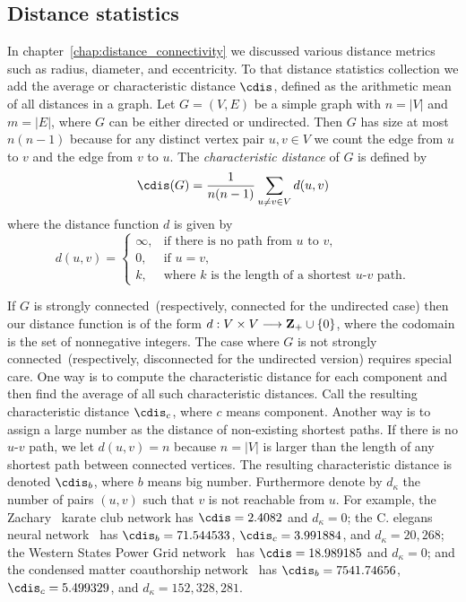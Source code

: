 
\subsection{Distance statistics}

In chapter~\ref{chap:distance_connectivity} we discussed various
distance metrics such as radius, diameter, and eccentricity. To that
distance statistics collection we add the average or characteristic
distance $\cdis$, defined as the arithmetic mean of all
distances in a graph. Let $G = (V,E)$ be a simple graph with
$n = |V|$ and $m = |E|$, where $G$ can be either directed or
undirected. Then $G$ has size at most $n(n - 1)$ because for any
distinct vertex pair $u,v \in V$ we count the edge from $u$ to $v$ and
the edge from $v$ to $u$. The
\emph{characteristic distance} of $G$
is defined by
\[
\cdis(G)
=
\frac{1}{n(n-1)}
\sum_{u \neq v \in V} d(u,v)
\]
where the distance function $d$ is given by
\[
d(u,v)
=
\begin{cases}
\infty, & \text{if there is no path from $u$ to $v$}, \\[4pt]
0, & \text{if $u = v$}, \\[4pt]
k, & \text{where $k$ is the length of a shortest $u$-$v$ path}.
\end{cases}
\]

If $G$ is strongly connected~(respectively, connected for the
undirected case) then our distance function is of the form
$d: V \times V \longrightarrow \mathbf{Z}_{+} \cup \{0\}$, where the codomain is the set
of nonnegative integers. The case where $G$ is not strongly
connected~(respectively, disconnected for the undirected version)
requires special care. One way is to compute the characteristic
distance for each component and then find the average of all such
characteristic distances. Call the resulting characteristic distance
$\cdis_c$, where $c$ means component. Another way is to assign
a large number as the distance of non-existing shortest paths. If
there is no $u$-$v$ path, we let $d(u,v) = n$ because $n = |V|$ is
larger than the length of any shortest path between connected
vertices. The resulting characteristic distance is denoted
$\cdis_b$, where $b$ means big number. Furthermore denote by
$d_\kappa$ the number of pairs $(u,v)$ such that $v$ is not reachable
from $u$. For example, the Zachary~\cite{Zachary1977} karate club
network has $\cdis = 2.4082$ and $d_\kappa = 0$; the C. elegans neural
network~\cite{WattsStrogatz1998,WhiteEtAl1986} has
$\cdis_b = 71.544533$, $\cdis_c = 3.991884$, and
$d_\kappa = 20,268$; the Western States Power Grid
network~\cite{WattsStrogatz1998} has $\cdis = 18.989185$ and
$d_\kappa = 0$; and the condensed matter coauthorship
network~\cite{Newman2001b} has $\cdis_b = 7541.74656$,
$\cdis_c = 5.499329$, and $d_\kappa = 152,328,281$.

